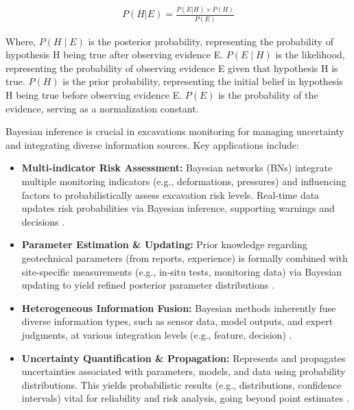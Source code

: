 \documentclass[preprint,11pt,authoryear,3p]{elsarticle}
\begin{document}
\begin{align}
    P(H|E)=\frac{P(E|H)\times P(H)}{P(E)}
    \label{equ:BayesianInference}
\end{align}

Where, $P(H \mid E)$ is the posterior probability, representing the probability of hypothesis H being true after observing evidence E. $P(E \mid H)$ is the likelihood, representing the probability of observing evidence E given that hypothesis H is true. $P(H)$ is the prior probability, representing the initial belief in hypothesis H being true before observing evidence E. $P(E)$ is the probability of the evidence, serving as a normalization constant.

Bayesian inference is crucial in excavations monitoring for managing uncertainty and integrating diverse information sources\citep{doi:10.1061/AJRUA6.RUENG-1363}. Key applications include:

\begin{itemize}
    \item \textbf{Multi-indicator Risk Assessment:} Bayesian networks (BNs) integrate multiple monitoring indicators (e.g., deformations, pressures) and influencing factors to probabilistically assess excavation risk levels. Real-time data updates risk probabilities via Bayesian inference, supporting warnings and decisions \citep{RiskAssessmentMethodology}.

    \item \textbf{Parameter Estimation \& Updating:} Prior knowledge regarding geotechnical parameters (from reports, experience) is formally combined with site-specific measurements (e.g., in-situ tests, monitoring data) via Bayesian updating to yield refined posterior parameter distributions \citep{WANG2016117}.

    \item \textbf{Heterogeneous Information Fusion:} Bayesian methods inherently fuse diverse information types, such as sensor data, model outputs, and expert judgments, at various integration levels (e.g., feature, decision) \citep{CAO2016107}.

    \item \textbf{Uncertainty Quantification \& Propagation:} Represents and propagates uncertainties associated with parameters, models, and data using probability distributions. This yields probabilistic results (e.g., distributions, confidence intervals) vital for reliability and risk analysis, going beyond point estimates \citep{WANG2025108098}.
\end{itemize}
\end{document}
